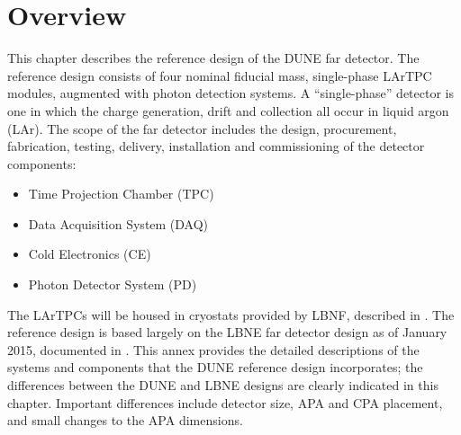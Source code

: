 \section{Overview}
\label{sec:detectors-fd-ref-ov}


This chapter describes the reference design of the DUNE far detector.
The reference design consists of four nominal  fiducial
mass, single-phase LArTPC modules, augmented with photon detection
systems.  A ``single-phase'' detector is one in which the charge
generation, drift and collection all occur in liquid argon (LAr). The
scope of the far detector includes the design, procurement,
fabrication, testing, delivery, installation and commissioning of the
detector components:
\begin{itemize}
\item Time Projection Chamber (TPC)
\item Data Acquisition System (DAQ)  
\item Cold Electronics (CE)
\item Photon Detector System (PD)
\end{itemize}
The LArTPCs will be housed in cryostats provided by LBNF, described in
\vollbnf. The reference design is based largely on the LBNE far
detector design as of January 2015, documented in \anxlbnefd. This
annex provides the detailed descriptions of the systems and components
that the DUNE reference design incorporates; the differences between
the DUNE and LBNE designs are clearly indicated in this
chapter. Important differences include detector size, APA and CPA
placement, and small changes to the APA dimensions.

